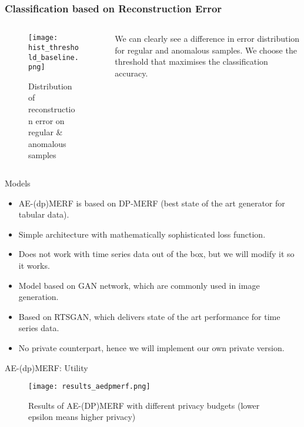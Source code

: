 \begin{frame}
    \frametitle{Classification based on Reconstruction Error}

    \begin{columns}
        \begin{column}{0.48\textwidth}
        \begin{figure}
            \centering
            \texttt{[image: hist\_threshold\_baseline.png]}
            \caption{Distribution of reconstruction error on regular \& anomalous samples}
        \end{figure}
    \end{column}
    \begin{column}{0.48\textwidth}
        We can clearly see a \alert{difference in error distribution} for regular and anomalous samples. We choose the \alert{threshold that maximises the classification} accuracy.
    \end{column}
    \end{columns}

\end{frame}


\begin{frame}{Models}
    \begin{itemize}
        \item<1-> AE-(dp)MERF is based on DP-MERF (best state of the art generator for tabular data).
        \item<2-> Simple architecture with mathematically sophisticated loss function.
        \item<3-> Does not work with time series data out of the box, but we will modify it so it works.
    \end{itemize}
    \begin{itemize}
        \item<5-> Model based on GAN network, which are commonly used in image generation.
        \item<6-> Based on RTSGAN, which delivers state of the art performance for time series data.
        \item<7> No private counterpart, hence we will implement our own private version.
    \end{itemize}
    
\end{frame}

\begin{frame}{AE-(dp)MERF: Utility}
    \begin{figure}
        \centering
        \texttt{[image: results\_aedpmerf.png]}
        \caption{Results of AE-(DP)MERF with different privacy budgets (lower epsilon means higher privacy)}
        \label{fig:enter-label}
    \end{figure}
\end{frame}

